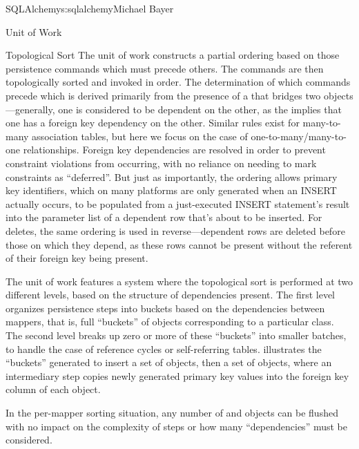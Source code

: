 \begin{aosachapter}{SQLAlchemy}{s:sqlalchemy}{Michael Bayer}
\begin{aosasect1}{Unit of Work}
\begin{aosasect2}{Topological Sort}
The unit of work constructs a partial ordering based on those persistence commands which must precede others.   The
commands are then topologically sorted and invoked in order.
The determination of which commands precede which is derived primarily from the
presence of a  that bridges two  objects---generally, one 
is considered to be dependent on the other, as the  implies that one 
has a foreign key dependency on the other.  Similar rules exist for many-to-many association tables, but here
we focus on the case of one-to-many/many-to-one relationships.   Foreign key dependencies are resolved
in order to prevent constraint violations from occurring, with no reliance on needing to
mark constraints as ``deferred''.   But just as importantly, the ordering allows
primary key identifiers, which on many platforms are only generated when an INSERT actually
occurs, to be populated from a just-executed INSERT statement's result into the parameter
list of a dependent row that's about to be inserted.   For deletes, the same ordering is used
in reverse---dependent rows are deleted before those on which they depend,
as these rows cannot be present without the referent of their foreign key being
present.

The unit of work features a system where the topological sort is
performed at two different levels, based on the structure of dependencies
present. The first level organizes persistence steps into buckets based on the
dependencies between mappers, that is, full ``buckets'' of objects corresponding
to a particular class. The second level breaks up zero or more of these
``buckets'' into smaller batches, to handle the case of reference cycles or
self-referring tables.  illustrates the ``buckets'' generated to insert
a set of  objects, then a set of  objects, where an
intermediary step copies newly generated  primary key values into the
 foreign key column of each  object.


In the per-mapper sorting situation, any number of  and  objects can be flushed
with no impact on the complexity of steps or how many ``dependencies'' must be considered.


\end{aosasect2}
\end{aosasect1}
\end{aosachapter}
